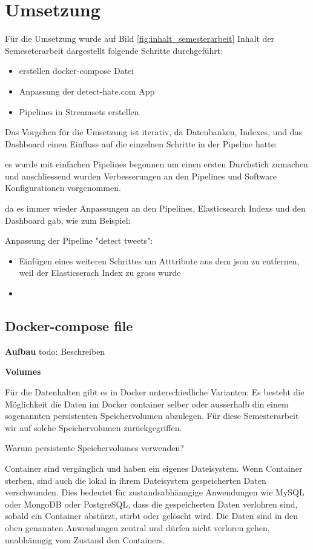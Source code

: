 \chapter{Umsetzung}
\label{chap:data_collection}
Für die Umsetzung wurde auf Bild \ref{fig:inhalt_semesterarbeit} Inhalt der Semeseterarbeit dargestellt folgende Schritte durchgeführt:

\begin{itemize}
  \item erstellen docker-compose Datei
  \item Anpassung der detect-hate.com App
  \item Pipelines in Streamsets erstellen
\end{itemize}

Das Vorgehen für die Umsetzung ist iterativ, da Datenbanken, Indexes, und das Dashboard einen Einfluss auf die einzelnen Schritte in der Pipeline hatte:


 es wurde mit einfachen Pipelines begonnen um einen ersten Durchstich zumachen und anschliessend wurden Verbesserungen an den Pipelines und Software Konfigurationen vorgenommen.

da es immer wieder Anpassungen an den Pipelines, Elasticsearch Indexs und den Dashboard gab, wie zum Beispiel: 

Anpassung der Pipeline "detect tweets": 
\begin{itemize}
  \item Einfügen eines weiteren Schrittes um Atttribute aus dem json zu entfernen, weil der Elasticserach Index zu gross wurde 
  \item 
\end{itemize}

\section{Docker-compose file }
\label{sec:docker_compose}

\textbf{Aufbau}
todo: Beschreiben

\textbf{Volumes}

F{\"u}r die Datenhalten gibt es in Docker unterschiedliche Varianten: Es besteht die M{\"o}glichkeit die Daten im Docker container selber oder ausserhalb din einem sogenannten persistenten Speichervolumen abzulegen. F{\"u}r diese Semesterarbeit wir auf solche Speichervolumen zur{\"u}ckgegriffen. 

Warum persistente Speichervolumes verwenden?

Container sind verg{\"a}nglich und haben ein eigenes Dateisystem.  Wenn Container sterben, sind auch die lokal in ihrem Dateisystem gespeicherten Daten verschwunden. Dies bedeutet f{\"u}r zustandsabh{\"a}nngige Anwendungen wie MySQL oder MongoDB oder PostgreSQL, dass die gespeicherten Daten verlohren sind, sobald ein Container abst{\"u}rzt, stirbt oder gel{\"o}scht wird. Die Daten sind in den oben genannten Anwendungen zentral und d{\"u}rfen nicht verloren gehen, unabh{\"a}nngig vom Zustand den Containers.

